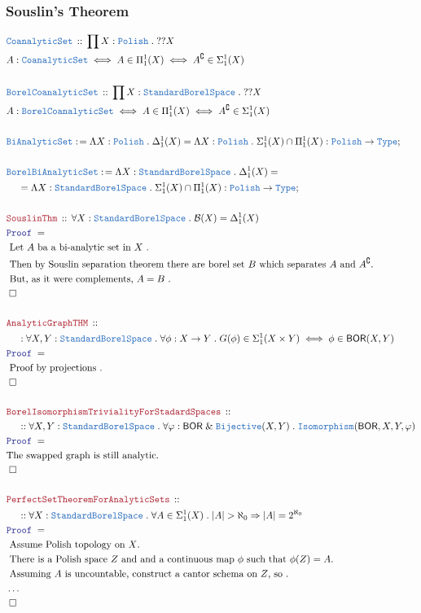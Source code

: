 \documentclass[12pt]{scrartcl}
\newcommand{\TYPE}[1]{\textcolor{NavyBlue}{\mathtt{#1}}}
\newcommand{\LOGIC}[1]{\textcolor{Blue}{\mathtt{#1}}}
\newcommand{\THM}[1]{\textcolor{Maroon}{\mathtt{#1}}}
\renewcommand{\.}{\; . \;}
\newcommand{\de}{: \kern 0.1pc =}
\newcommand{\Theorem}[2]{& \THM{#1} \, :: \, #2 \\ & \Proof = \\ }
\newcommand{\DeclareType}[2]{& \TYPE{#1} \, :: \, #2 \\}
\newcommand{\DefineNamedType}[4]{& #1 : \TYPE{#2} \iff #3 \iff #4 \\}
\newcommand{\NewLine}{\\ & \kern 1pc}
\newcommand{\Page}[1]{ \begin{align*} #1 \end{align*}   }
\newcommand{\NoProof}{ & \ldots \\ \EndProof}
\renewcommand{\And}{\; \& \;}
\newcommand{\Imply}{\Rightarrow}
\newcommand{\Type}{\TYPE{Type}}
\renewcommand{\c}{\complement}
\newcommand{\Conclude}[3]{& #1 \de #2 : #3; \\}
\newcommand{\QED}{\; \square}
\newcommand{\EndProof}{& \QED \\}
\newcommand{\Proof}{\LOGIC{Proof} \; }
\newcommand{\Explain}[1]{& \text{#1.} \\}
\newcommand{\Bij}{\TYPE{Bijective}}
\newcommand{\B}{\mathcal{B}}
\newcommand{\Polish}{\TYPE{Polish}}
\newcommand{\SBS}{\TYPE{StandardBorelSpace}}
\newcommand{\BOR}{\mathsf{BOR}}
\begin{document}
\subsubsection{Souslin's Theorem}
\Page{
	\DeclareType{CoanalyticSet}{\prod X : \Polish \. ??X}
	\DefineNamedType{A}{CoanalyticSet}
	{
			A \in \Pi^1_1(X)
	}
	{
		A^\c \in \Sigma^1_1(X)
	}
	\\
	\DeclareType{BorelCoanalyticSet}{\prod X : \SBS \. ??X}
	\DefineNamedType{A}{BorelCoanalyticSet}
	{
			A \in \Pi^1_1(X)
	}
	{
		A^\c \in \Sigma^1_1(X)
	}
	\\
	\Conclude{\TYPE{BiAnalyticSet}}
	{
		\Lambda X : \Polish \.
		\Delta^1_1(X)	
		=		
		\Lambda X : \Polish \.
		\Sigma^1_1(X) \cap \Pi^1_1(X)	
	}
	{
		\Polish \to \Type
	}
	\\
	\Conclude{\TYPE{BorelBiAnalyticSet}}
	{
		\Lambda X : \SBS \.
		\Delta^1_1(X)	
		= \NewLine =		
		\Lambda X : \SBS \.
		\Sigma^1_1(X) \cap \Pi^1_1(X)	
	}
	{
		\Polish \to \Type
	}
	\\
	\Theorem{SouslinThm}
	{
		\forall X : \SBS \.
		\B(X) = \Delta^1_1(X)
	}
	\Explain{ Let $A$ ba a bi-analytic set in $X$ }
	\Explain{ Then by Souslin separation theorem there are borel set $B$ 
	which separates $A$ and $A^\c$}
	\Explain{ But, as it were complements, $A = B$ }
	\EndProof
	\\
	\Theorem{AnalyticGraphTHM}
	{
		\NewLine :		
		\forall X,Y : \SBS \.
		\forall \phi : X \to Y \.
		G(\phi) \in \Sigma^1_1(X \times Y) 
		\iff
		\phi \in \BOR(X,Y)
	}
	\Explain{ Proof by projections }
	\EndProof
	\\
	\Theorem{BorelIsomorphismTrivialityForStadardSpaces}
	{
		\NewLine ::		
		\forall X,Y : \SBS \.
		\forall \varphi : \BOR \And \Bij(X,Y) \.
		\TYPE{Isomorphism}(\BOR,X,Y,\varphi)
	}
	\Explain{The swapped graph is still analytic}
	\EndProof
	\\
	\Theorem{PerfectSetTheoremForAnalyticSets}
	{
		\NewLine ::		
		\forall X : \SBS \.
		\forall A \in \Sigma^1_1(X) \.
		|A| > \aleph_0 \Imply |A| = 2^{\aleph_0}
	}
	\Explain{ Assume Polish topology on $X$}
	\Explain{ There is a Polish space $Z$ and
		and a continuous map $\phi$ such that
		$\phi(Z) = A$}
	\Explain{
		Assuming $A$ is uncountable,
		construct a cantor schema on $Z$,
		so
		}
	\NoProof
}
\newpage
\end{document}
